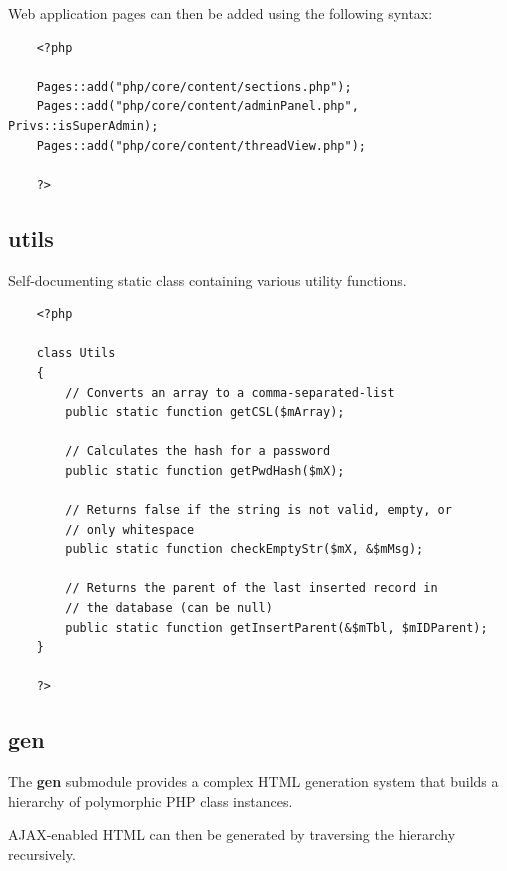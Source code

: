 \documentclass[12pt]{report}
\renewcommand\emph{\textbf}
\begin{document}
                    Web application pages can then be added using the following syntax:

                    \begin{verbatim}
    <?php

    Pages::add("php/core/content/sections.php");
    Pages::add("php/core/content/adminPanel.php", Privs::isSuperAdmin);
    Pages::add("php/core/content/threadView.php");

    ?>
                    \end{verbatim}

                \subsection{utils}

                    Self-documenting static class containing various utility functions.

                    \begin{verbatim}
    <?php

    class Utils
    {
        // Converts an array to a comma-separated-list
        public static function getCSL($mArray);

        // Calculates the hash for a password
        public static function getPwdHash($mX);

        // Returns false if the string is not valid, empty, or
        // only whitespace
        public static function checkEmptyStr($mX, &$mMsg);

        // Returns the parent of the last inserted record in
        // the database (can be null)
        public static function getInsertParent(&$mTbl, $mIDParent);
    }

    ?>
                    \end{verbatim}                

                \subsection{gen}

                    The \emph{gen} submodule provides a complex HTML generation system that builds a hierarchy of polymorphic PHP class instances.

                    AJAX-enabled HTML can then be generated by traversing the hierarchy recursively.
\end{document}
